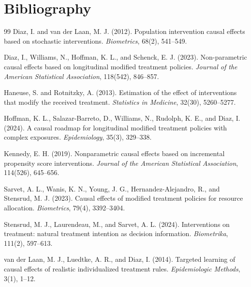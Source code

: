 \documentclass[11pt]{article}
\theoremstyle{definition}
\theoremstyle{plain}
\theoremstyle{remark}
\begin{document}
\section*{Bibliography}
\begin{thebibliography}{99}
Diaz, I. and van der Laan, M. J. (2012).
Population intervention causal effects based on stochastic interventions.
\emph{Biometrics}, 68(2), 541--549.

Diaz, I., Williams, N., Hoffman, K. L., and Schenck, E. J. (2023).
Non-parametric causal effects based on longitudinal modified treatment policies.
\emph{Journal of the American Statistical Association}, 118(542), 846--857.

Haneuse, S. and Rotnitzky, A. (2013).
Estimation of the effect of interventions that modify the received treatment.
\emph{Statistics in Medicine}, 32(30), 5260--5277.

Hoffman, K. L., Salazar-Barreto, D., Williams, N., Rudolph, K. E., and Diaz, I. (2024).
A causal roadmap for longitudinal modified treatment policies with complex exposures.
\emph{Epidemiology}, 35(3), 329--338.

Kennedy, E. H. (2019).
Nonparametric causal effects based on incremental propensity score interventions.
\emph{Journal of the American Statistical Association}, 114(526), 645--656.

Sarvet, A. L., Wanis, K. N., Young, J. G., Hernandez-Alejandro, R., and Stensrud, M. J. (2023).
Causal effects of modified treatment policies for resource allocation.
\emph{Biometrics}, 79(4), 3392--3404.

Stensrud, M. J., Laurendeau, M., and Sarvet, A. L. (2024).
Interventions on treatment: natural treatment intention as decision information.
\emph{Biometrika}, 111(2), 597--613.

van der Laan, M. J., Luedtke, A. R., and Diaz, I. (2014).
Targeted learning of causal effects of realistic individualized treatment rules.
\emph{Epidemiologic Methods}, 3(1), 1--12.


\end{thebibliography}
\end{document}

